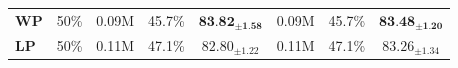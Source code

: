 \documentclass[letterpaper]{article} %
\begin{document}
\begin{table}[!t]
{\begin{tabular}{@{}l|c|ccc|ccc@{}}
\text{\Large\textcolor{mygreen}{$\bullet$}} \textbf{WP}                   & 50\%                                          &  0.09M                                            &  45.7\%                                                                      &         $\textbf{83.82}_{ \pm \textbf{1.58}}$        &  0.09M                                            &   45.7\%                                                                      &   $\textbf{83.48}_{ \pm \textbf{1.20}}$                                                                     \\
\text{\Large\textcolor{myorange}{$\bullet$}} \textbf{LP}                   & 50\%                                          & 0.11M                                             & 47.1\%                                                                       &        $82.80_{ \pm 1.22}$  & 0.11M                                           &     47.1\%                                                                     &  $83.26_{ \pm 1.34}$                                                                              
 \\\bottomrule
\end{tabular}%
}
\end{table}


 



\end{document}
